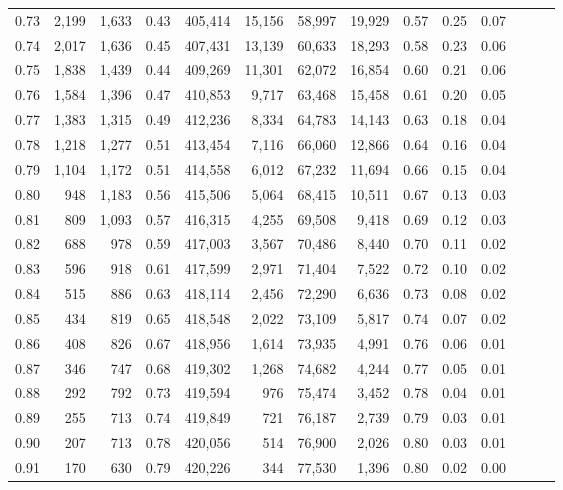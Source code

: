 \begin{tabular}{rrrrrrrrrrrrrr}
0.73 &  2,199 &  1,633 &  0.43 &  405,414 &   15,156 &  58,997 &  19,929 &  0.57 &  0.25 &      0.07 \\
0.74 &  2,017 &  1,636 &  0.45 &  407,431 &   13,139 &  60,633 &  18,293 &  0.58 &  0.23 &      0.06 \\
0.75 &  1,838 &  1,439 &  0.44 &  409,269 &   11,301 &  62,072 &  16,854 &  0.60 &  0.21 &      0.06 \\
0.76 &  1,584 &  1,396 &  0.47 &  410,853 &    9,717 &  63,468 &  15,458 &  0.61 &  0.20 &      0.05 \\
0.77 &  1,383 &  1,315 &  0.49 &  412,236 &    8,334 &  64,783 &  14,143 &  0.63 &  0.18 &      0.04 \\
0.78 &  1,218 &  1,277 &  0.51 &  413,454 &    7,116 &  66,060 &  12,866 &  0.64 &  0.16 &      0.04 \\
0.79 &  1,104 &  1,172 &  0.51 &  414,558 &    6,012 &  67,232 &  11,694 &  0.66 &  0.15 &      0.04 \\
0.80 &    948 &  1,183 &  0.56 &  415,506 &    5,064 &  68,415 &  10,511 &  0.67 &  0.13 &      0.03 \\
0.81 &    809 &  1,093 &  0.57 &  416,315 &    4,255 &  69,508 &   9,418 &  0.69 &  0.12 &      0.03 \\
0.82 &    688 &    978 &  0.59 &  417,003 &    3,567 &  70,486 &   8,440 &  0.70 &  0.11 &      0.02 \\
0.83 &    596 &    918 &  0.61 &  417,599 &    2,971 &  71,404 &   7,522 &  0.72 &  0.10 &      0.02 \\
0.84 &    515 &    886 &  0.63 &  418,114 &    2,456 &  72,290 &   6,636 &  0.73 &  0.08 &      0.02 \\
0.85 &    434 &    819 &  0.65 &  418,548 &    2,022 &  73,109 &   5,817 &  0.74 &  0.07 &      0.02 \\
0.86 &    408 &    826 &  0.67 &  418,956 &    1,614 &  73,935 &   4,991 &  0.76 &  0.06 &      0.01 \\
0.87 &    346 &    747 &  0.68 &  419,302 &    1,268 &  74,682 &   4,244 &  0.77 &  0.05 &      0.01 \\
0.88 &    292 &    792 &  0.73 &  419,594 &      976 &  75,474 &   3,452 &  0.78 &  0.04 &      0.01 \\
0.89 &    255 &    713 &  0.74 &  419,849 &      721 &  76,187 &   2,739 &  0.79 &  0.03 &      0.01 \\
0.90 &    207 &    713 &  0.78 &  420,056 &      514 &  76,900 &   2,026 &  0.80 &  0.03 &      0.01 \\
0.91 &    170 &    630 &  0.79 &  420,226 &      344 &  77,530 &   1,396 &  0.80 &  0.02 &      0.00 \\

\end{tabular}
